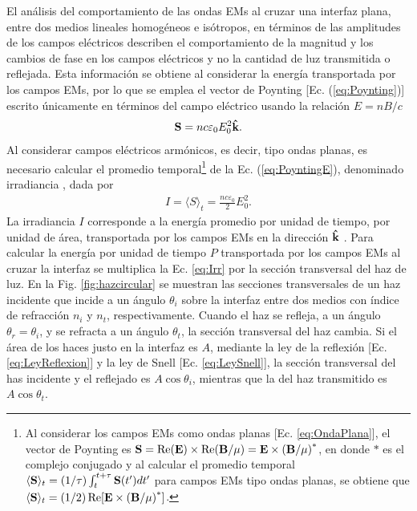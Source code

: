 El análisis del comportamiento de las ondas EMs al cruzar una interfaz plana, entre dos medios lineales homogéneos e isótropos, en términos de las amplitudes de los campos eléctricos describen el comportamiento de la magnitud y los cambios de fase en los campos eléctricos  y no la cantidad de luz transmitida o reflejada. Esta información se obtiene al considerar la energía transportada por los campos EMs, por lo que se emplea el vector de Poynting [Ec. (\ref{eq:Poynting})] escrito únicamente en términos del campo eléctrico usando la relación $E = n B/c$ 
	\begin{align}
	\vb{S} = n c\varepsilon_0 E_0^2 \vu{k}. \label{eq:PoyntingE}
	\end{align}
Al considerar campos eléctricos armónicos, es decir, tipo ondas planas, es necesario calcular el promedio temporal\footnote{Al considerar los campos EMs como ondas planas [Ec. \eqref{eq:OndaPlana}], el vector de Poynting es $\vb{S} = \Re(\vb{E})\times\Re(\vb{B}/\mu) = \vb{E}\times\qty(\vb{B}/\mu)^*$, en donde $*$ es el complejo conjugado y al calcular el promedio temporal $\langle\vb{S}\rangle_t = (1/\tau)\int_t^{t+\tau}\vb{S}(t')dt'$ para campos EMs tipo ondas planas, se obtiene que $\langle\vb{S}\rangle_t = (1/2) \Re[\vb{E}\times\qty(\vb{B}/\mu)^*]$.} de la Ec. (\ref{eq:PoyntingE}), denominado  irradiancia \cite{hecht1998optics}, dada por
	\begin{align}
	I = \langle S \rangle_t = \frac{nc\varepsilon_0}{2} E_0^2.
	\label{eq:Irr}
	\end{align}
La irradiancia $I$ corresponde a la energía promedio por unidad de tiempo, por unidad de área, transportada por los campos EMs en la dirección $\vu{k}$ \cite{griffiths2013electrodynamics}. Para calcular la energía por unidad de tiempo $P$ transportada por los campos EMs al cruzar la interfaz se multiplica la Ec. \eqref{eq:Irr} por la sección transversal del haz de luz. En la Fig. \ref{fig:hazcircular} se muestran las secciones transversales de un haz incidente que incide a un ángulo $\theta_i$ sobre la interfaz entre dos medios con índice de refracción $n_i$ y $n_t$, respectivamente. Cuando el haz se refleja, a un ángulo $\theta_r=\theta_i$, y se refracta a un ángulo $\theta_t$, la sección transversal del haz cambia. Si el área de los haces justo en la interfaz es $A$, mediante la ley de la reflexión [Ec. \eqref{eq:LeyReflexion}] y la ley de Snell [Ec. \eqref{eq:LeySnell}], la sección transversal del has incidente y el reflejado  es $A\cos\theta_i$, mientras que la del haz transmitido es $A\cos\theta_t$.

